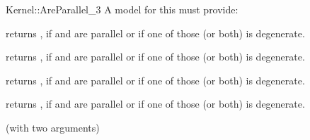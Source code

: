 \begin{ccRefFunctionObjectConcept}{Kernel::AreParallel_3}
A model for this must provide:


{returns , if  and  are parallel or if one
of those (or both) is degenerate.}

{returns , if  and  are parallel or if one
of those (or both) is degenerate.}

{returns , if  and  are parallel or if one
of those (or both) is degenerate.}

{returns , if  and  are parallel or if one
of those (or both) is degenerate.}

\ccRefines
{} (with two arguments)

\ccSeeAlso
{} \\

\end{ccRefFunctionObjectConcept}
